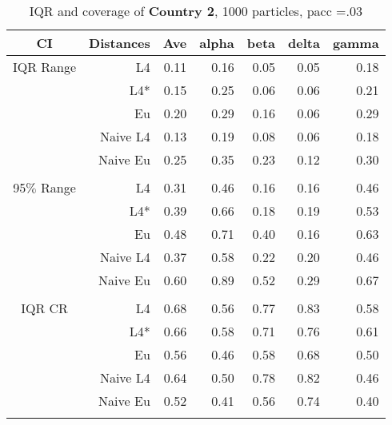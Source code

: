 \documentclass[a4paper,12pt,twoside]{book}
\begin{document}
\begin{table}[H]
\centering
\caption{IQR and coverage of \textbf{Country 2}, 1000 particles, pacc =.03}

\begin{tabular}{crrrrrr}
  \hline
{\color{blue}CI} & Distances & Ave & alpha & beta & delta & gamma \\ 
  \hline
{\color{blue}IQR Range}& L4  &0.11 & 0.16 & 0.05 & 0.05 & 0.18 \\ 
  
 &L4*  &0.15 & 0.25 & 0.06 & 0.06 & 0.21 \\ 
 
&Eu &     0.20 & 0.29 & 0.16 & 0.06 & 0.29 \\ 
 
&Naive L4& 0.13 & 0.19 & 0.08 & 0.06 & 0.18 \\  
  
&Naive Eu &  0.25 & 0.35 & 0.23 & 0.12 & 0.30 \\ \\
  
    {\color{blue}95$\%$ Range} & L4  &0.31 & 0.46 & 0.16 & 0.16 & 0.46 \\ 
  
    &L4*  & 0.39 & 0.66 & 0.18 & 0.19 & 0.53 \\ 
  
&Eu &  0.48 & 0.71 & 0.40 & 0.16 & 0.63 \\ 
  
&Naive L4&   0.37 & 0.58 & 0.22 & 0.20 & 0.46 \\ 
 
&Naive Eu &    0.60 & 0.89 & 0.52 & 0.29 & 0.67 \\ 
     \\
   \hline
   
{\color{blue} IQR CR } & L4  &0.68 & 0.56 & 0.77 & 0.83 & 0.58 \\ 
  
&L4*  & 0.66 & 0.58 & 0.71 & 0.76 & 0.61 \\ 
  
&Eu &   0.56 & 0.46 & 0.58 & 0.68 & 0.50 \\ 
  
&Naive L4&   0.64 & 0.50 & 0.78 & 0.82 & 0.46 \\ 
  
&Naive Eu &  0.52 & 0.41 & 0.56 & 0.74 & 0.40 \\\\ 



\end{tabular}
\end{table}
\end{document}
